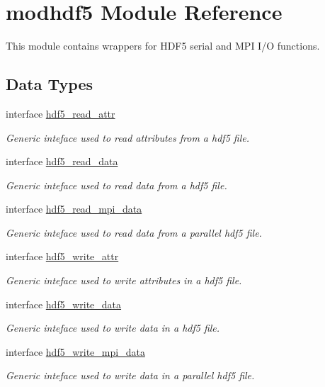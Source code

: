 \hypertarget{classmodhdf5}{\section{modhdf5 Module Reference}
\label{classmodhdf5}
}


This module contains wrappers for H\-D\-F5 serial and M\-P\-I I/\-O functions.  


\subsection*{Data Types}
\begin{DoxyCompactItemize}
\item 
interface \hyperlink{interfacemodhdf5_1_1hdf5__read__attr}{hdf5\-\_\-read\-\_\-attr}
\begin{DoxyCompactList}\small\item\em Generic inteface used to read attributes from a hdf5 file. \end{DoxyCompactList}\item 
interface \hyperlink{interfacemodhdf5_1_1hdf5__read__data}{hdf5\-\_\-read\-\_\-data}
\begin{DoxyCompactList}\small\item\em Generic inteface used to read data from a hdf5 file. \end{DoxyCompactList}\item 
interface \hyperlink{interfacemodhdf5_1_1hdf5__read__mpi__data}{hdf5\-\_\-read\-\_\-mpi\-\_\-data}
\begin{DoxyCompactList}\small\item\em Generic inteface used to read data from a parallel hdf5 file. \end{DoxyCompactList}\item 
interface \hyperlink{interfacemodhdf5_1_1hdf5__write__attr}{hdf5\-\_\-write\-\_\-attr}
\begin{DoxyCompactList}\small\item\em Generic inteface used to write attributes in a hdf5 file. \end{DoxyCompactList}\item 
interface \hyperlink{interfacemodhdf5_1_1hdf5__write__data}{hdf5\-\_\-write\-\_\-data}
\begin{DoxyCompactList}\small\item\em Generic inteface used to write data in a hdf5 file. \end{DoxyCompactList}\item 
interface \hyperlink{interfacemodhdf5_1_1hdf5__write__mpi__data}{hdf5\-\_\-write\-\_\-mpi\-\_\-data}
\begin{DoxyCompactList}\small\item\em Generic inteface used to write data in a parallel hdf5 file. \end{DoxyCompactList}\end{DoxyCompactItemize}
